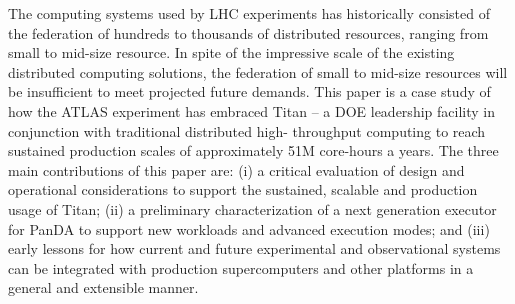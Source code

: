 The computing systems used by LHC experiments has historically consisted of
the federation of hundreds to thousands of distributed resources, ranging from
small to mid-size resource.  In spite of the impressive scale of the existing
distributed computing solutions, the federation of small to mid-size
resources will be insufficient to meet projected future demands.
This paper is a case study of how the ATLAS experiment has embraced Titan -- a
DOE leadership facility in conjunction with traditional distributed high-
throughput computing to reach sustained production scales of approximately 51M
core-hours a years. The three main contributions of this paper are:  (i) a
critical evaluation of design and operational considerations  to support the
sustained, scalable and production usage of Titan;  (ii) a preliminary
characterization of a next generation executor for PanDA to support new
workloads and  advanced execution modes; and (iii) early lessons for how
current and future experimental and observational systems can be integrated
with production supercomputers and other platforms in a general and extensible
manner.

